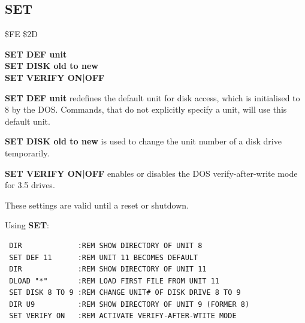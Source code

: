 
\newpage
\subsection{SET}
\begin{description}[leftmargin=2cm,style=nextline]
\item [Token:] \$FE \$2D
\item [Format:] {\bf SET DEF unit} \\
                {\bf SET DISK old to new} \\
                {\bf SET VERIFY ON|OFF}
\item [Usage:]  {\bf SET DEF unit} redefines the default unit
                for disk access, which is initialised to 8 by
                the DOS. Commands, that do not explicitly
                specify a unit, will use this default unit.

                {\bf SET DISK old to new} is used to change
                the unit number of a disk drive temporarily.

                {\bf SET VERIFY ON|OFF} enables or disables
                the DOS verify-after-write mode for
                3.5 drives.

\item [Remarks:] These settings are valid until a reset
                 or shutdown.

\item [Example:] Using {\bf SET}:
\begin{tcolorbox}[colback=black,coltext=white]
\verbatimfont{\codefont}
\begin{verbatim}
 DIR             :REM SHOW DIRECTORY OF UNIT 8
 SET DEF 11      :REM UNIT 11 BECOMES DEFAULT
 DIR             :REM SHOW DIRECTORY OF UNIT 11
 DLOAD "*"       :REM LOAD FIRST FILE FROM UNIT 11
 SET DISK 8 TO 9 :REM CHANGE UNIT# OF DISK DRIVE 8 TO 9
 DIR U9          :REM SHOW DIRECTORY OF UNIT 9 (FORMER 8)
 SET VERIFY ON   :REM ACTIVATE VERIFY-AFTER-WTITE MODE
\end{verbatim}
\end{tcolorbox}
\end{description}


\newpage
